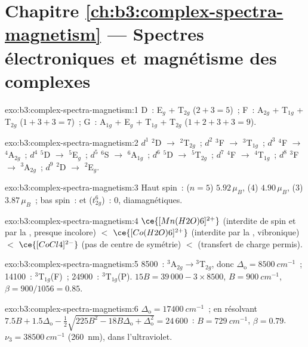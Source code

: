 \section*{Chapitre \ref{ch:b3:complex-spectra-magnetism} --- Spectres électroniques et magnétisme des complexes}

\begin{solution}{exo:b3:complex-spectra-magnetism:1}
D~: E$_g$ + T$_{2g}$ ($2 + 3 = 5$)~; F~: A$_{2g}$ + T$_{1g}$ + T$_{2g}$ ($1 + 3 + 3 = 7$)~; G~: A$_{1g}$ + E$_g$ + T$_{1g}$ + T$_{2g}$
($1 + 2 + 3 + 3 = 9$).
\end{solution}

\begin{solution}{exo:b3:complex-spectra-magnetism:2}
$d^1$ $^2$D $\to$ $^2$T$_{2g}$~; $d^2$ $^3$F $\to$ $^3$T$_{1g}$~; $d^3$ $^4$F $\to$ $^4$A$_{2g}$~; $d^4$ $^5$D $\to$ $^5$E$_g$~; $d^5$ $^6$S $\to$ $^6$A$_{1g}$~; $d^6$ $^5$D
$\to$ $^5$T$_{2g}$~; $d^7$ $^4$F $\to$ $^4$T$_{1g}$~; $d^8$ $^3$F $\to$ $^3$A$_{2g}$~; $d^9$ $^2$D $\to$ $^2$E$_g$.
\end{solution}

\begin{solution}{exo:b3:complex-spectra-magnetism:3}
Haut spin~:  ($n = 5$) $5.92\,\mu_B$,  (4) $4.90\,\mu_B$,  (3) $3.87\,\mu_B$~; bas spin~:  et
 ($t_{2g}^6$)~: 0, diamagnétiques.
\end{solution}

\begin{solution}{exo:b3:complex-spectra-magnetism:4}
$\ce{[Mn(H2O)6]^{2+}}$ (interdite de spin et par la , presque incolore) $<$ $\ce{[Co(H2O)6]^{2+}}$
(interdite par la , vibronique) $<$ $\ce{[CoCl4]^{2-}}$ (pas de centre de symétrie) $<$  (transfert
de charge permis).
\end{solution}

\begin{solution}{exo:b3:complex-spectra-magnetism:5}
8500~: $^3$A$_{2g}\to{}^3$T$_{2g}$, donc $\Delta_{\mathrm o} = \qty{8500}{cm^{-1}}$~; 14100~: $^3$T$_{1g}$(F)~; 24900~: $^3$T$_{1g}$(P).
$15B = 39\,000 - 3 \times 8500$, $B = \qty{900}{cm^{-1}}$, $\beta = 900/1056 = 0.85$.
\end{solution}

\begin{solution}{exo:b3:complex-spectra-magnetism:6}
$\Delta_{\mathrm o} = \qty{17400}{cm^{-1}}$~; en résolvant $7.5B + 1.5\Delta_{\mathrm o} - \frac12\sqrt{225B^2 - 18B\Delta_{\mathrm o} + \Delta_{\mathrm o}^2} = 24\,600$~: $B = \qty{729}{cm^{-1}}$,
$\beta = 0.79$. $\nu_3 = \qty{38500}{cm^{-1}}$ (\qty{260}{nm}), dans l'ultraviolet.
\end{solution}

